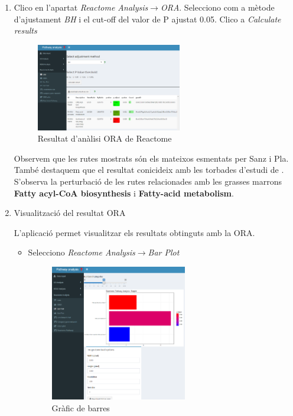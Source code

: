 \begin{enumerate}
\item Clico en l'apartat \textit{Reactome Analysis}$\rightarrow$\textit{ORA}. Selecciono com a mètode d'ajustament \textit{BH} i el cut-off del valor de P ajustat 0.05. Clico a \textit{Calculate results}

\begin{figure}[H]
\centering
\includegraphics[width=0.6\textwidth]{figures/Estudi1_Fig3_ORA_RA.png} 
\caption{Resultat d'anàlisi ORA de Reactome}
\end{figure}

Observem que les rutes mostrats són els mateixos esmentats per Sanz i Pla. També destaquem que el resultat conicideix amb les torbades d'estudi de \cite{li2017zbtb7b}. S'observa la perturbació de les rutes relacionades amb les grasses marrons \textbf{Fatty acyl-CoA biosynthesis} i \textbf{Fatty-acid metabolism}.

\item Visualització del resultat ORA

L'aplicació permet visualitzar els resultats obtinguts amb la ORA. 

\begin{itemize}
\item Selecciono \textit{Reactome Analysis}$\rightarrow$\textit{Bar Plot}

\begin{figure}[H]
\centering
\includegraphics[width=0.6\textwidth]{figures/Estudi1_Fig4_ORA_BP_RA.png} 
\caption{Gràfic de barres}
\end{figure}


\end{itemize}
\end{enumerate}
